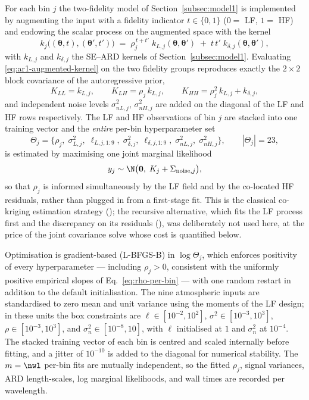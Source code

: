For each bin $j$ the two-fidelity model of Section~\ref{subsec:model1} is
implemented by augmenting the input with a fidelity indicator
$t\in\{0,1\}$ ($0=$ LF, $1=$ HF) and endowing the scalar process on the
augmented space with the kernel
\begin{equation}
  k_j\bigl((\boldsymbol\theta,t),(\boldsymbol\theta',t')\bigr)
  \;=\;
  \rho_j^{\,t+t'}\; k_{L,j}(\boldsymbol\theta,\boldsymbol\theta')
  \;+\;
  t\,t'\; k_{\delta,j}(\boldsymbol\theta,\boldsymbol\theta'),
  \label{eq:ar1-augmented-kernel}
\end{equation}
with $k_{L,j}$ and $k_{\delta,j}$ the SE--ARD kernels of
Section~\ref{subsec:model1}. Evaluating
\eqref{eq:ar1-augmented-kernel} on the two fidelity groups reproduces exactly
the $2\times2$ block covariance of the autoregressive prior,
\[
    K_{LL}=k_{L,j},\qquad
    K_{LH}=\rho_j\,k_{L,j},\qquad
    K_{HH}=\rho_j^{2}\,k_{L,j}+k_{\delta,j},
\]
and independent noise levels $\sigma^2_{nL,j}$, $\sigma^2_{nH,j}$ are added on
the diagonal of the LF and HF rows respectively. The LF and HF observations of
bin $j$ are stacked into one training vector and the \emph{entire}
per-bin hyperparameter set
\[
  \Theta_j=\bigl\{\rho_j,\;\sigma^2_{L,j},\;\boldsymbol\ell_{L,j,1:9},\;
    \sigma^2_{\delta,j},\;\boldsymbol\ell_{\delta,j,1:9},\;
    \sigma^2_{nL,j},\;\sigma^2_{nH,j}\bigr\},
  \qquad |\Theta_j| = 23,
\]
is estimated by maximising one joint marginal likelihood
\[
    y_j \sim \N\bigl(\mathbf 0,\; K_j + \Sigma_{\mathrm{noise},j}\bigr),
\]
so that $\rho_j$ is informed simultaneously by the LF field and by the
co-located HF residuals, rather than plugged in from a first-stage fit. This
is the classical co-kriging estimation strategy
(); the
recursive alternative, which fits the LF process first and the discrepancy on
its residuals (), was deliberately not used here, at the
price of the joint covariance solve whose cost is quantified below.

Optimisation is gradient-based (L-BFGS-B) in $\log\Theta_j$, which enforces
positivity of every hyperparameter --- including $\rho_j>0$, consistent with
the uniformly positive empirical slopes of Eq.~\ref{eq:rho-per-bin} --- with
one random restart in addition to the default initialisation. The nine
atmospheric inputs are standardised to zero mean and unit variance using the
moments of the LF design; in these units the box constraints are
$\ell\in[10^{-2},10^{2}]$, $\sigma^2\in[10^{-3},10^{3}]$,
$\rho\in[10^{-3},10^{3}]$, and $\sigma^2_{n}\in[10^{-8},10]$, with
$\ell$ initialised at $1$ and $\sigma^2_{n}$ at $10^{-4}$. The stacked
training vector of each bin is centred and scaled internally before fitting,
and a jitter of $10^{-10}$ is added to the diagonal for numerical stability.
The $m=\nwl$ per-bin fits are mutually independent, so the fitted $\rho_j$,
signal variances, ARD length-scales, log marginal likelihoods, and wall times
are recorded per wavelength.

